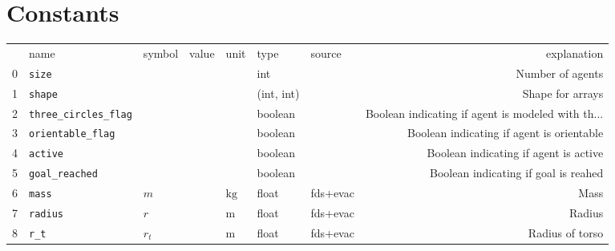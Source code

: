 \section{Constants}

\begin{table}[H]
\begin{tabularx}{1.0\linewidth}{rllllllR}
{} &                            name &           symbol &                               value &                         unit &        type &     source &                                        explanation \\
0  &                     \verb|size| &                  &                                     &                              &         int &            &                                   Number of agents \\
1  &                    \verb|shape| &                  &                                     &                              &  (int, int) &            &                                   Shape for arrays \\
2  &       \verb|three_circles_flag| &                  &                                     &                              &     boolean &            &  Boolean indicating if agent is modeled with th... \\
3  &          \verb|orientable_flag| &                  &                                     &                              &     boolean &            &         Boolean indicating if agent is orientable  \\
4  &                   \verb|active| &                  &                                     &                              &     boolean &            &              Boolean indicating if agent is active \\
5  &             \verb|goal_reached| &                  &                                     &                              &     boolean &            &               Boolean indicating if goal is reahed \\
6  &                     \verb|mass| &              $m$ &                                     &                $\mathrm{kg}$ &       float &   fds+evac &                                               Mass \\
7  &                   \verb|radius| &              $r$ &                                     &                 $\mathrm{m}$ &       float &   fds+evac &                                             Radius \\
8  &                      \verb|r_t| &          $r_{t}$ &                                     &                 $\mathrm{m}$ &       float &   fds+evac &                                    Radius of torso \\

\end{tabularx}
\end{table}
